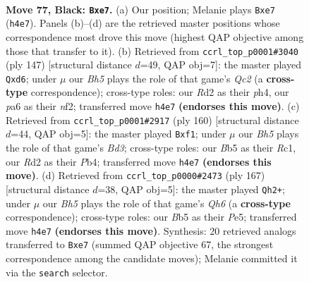 \documentclass[11pt]{article}
\begin{document}
\clearpage

\begin{figure}[p]\centering
\begin{subfigure}{0.46\textwidth}\centering
\resizebox{\linewidth}{!}{%
\newchessgame
\chessboard[
  setfen={8/4Rk2/P3R3/1b3p2/5P1b/8/3r4/6K1 b - - 0 77},
  showmover=false,
  pgfstyle=straightmove, color=movearrow, markmove={h4-e7}
]}
\caption{}
\end{subfigure}\hfill
\begin{subfigure}{0.46\textwidth}\centering
\resizebox{\linewidth}{!}{%
\newchessgame
\chessboard[
  setfen={8/2q5/3R2p1/1P2kb2/3R3P/5P2/5NK1/8 b - - 3 74},
  showmover=false,
  pgfstyle=straightmove, color=movearrow, markmove={c7-d6}
]}
\caption{}
\end{subfigure}
\\[4pt]
\begin{subfigure}{0.46\textwidth}\centering
\resizebox{\linewidth}{!}{%
\newchessgame
\chessboard[
  setfen={8/Pb4p1/3k3p/7P/1P6/3B1r2/3K4/2R2r2 w - - 0 81},
  showmover=false,
  pgfstyle=straightmove, color=movearrow, markmove={d3-f1}
]}
\caption{}
\end{subfigure}\hfill
\begin{subfigure}{0.46\textwidth}\centering
\resizebox{\linewidth}{!}{%
\newchessgame
\chessboard[
  setfen={8/8/1p4k1/4p1P1/P3R3/4R2q/5K2/8 b - - 18 84},
  showmover=false,
  pgfstyle=straightmove, color=movearrow, markmove={h3-h2}
]}
\caption{}
\end{subfigure}
\caption{\textbf{Move 77, Black: \texttt{Bxe7}.} (a) Our position; Melanie plays \texttt{Bxe7} (\texttt{h4e7}). Panels (b)--(d) are the retrieved master positions whose correspondence most drove this move (highest QAP objective among those that transfer to it). (b) Retrieved from \texttt{ccrl\_top\_p0001\#3040} (ply 147) [structural distance $d$=49, QAP obj=7]: the master played \texttt{Qxd6}; under $\mu$ our \emph{Bh5} plays the role of that game's \emph{Qc2} (a \textbf{cross-type} correspondence); cross-type roles: our \emph{R}d2 as their \emph{p}h4, our \emph{p}a6 as their \emph{n}f2; transferred move \texttt{h4e7} \textbf{(endorses this move)}. (c) Retrieved from \texttt{ccrl\_top\_p0001\#2917} (ply 160) [structural distance $d$=44, QAP obj=5]: the master played \texttt{Bxf1}; under $\mu$ our \emph{Bh5} plays the role of that game's \emph{Bd3}; cross-type roles: our \emph{B}b5 as their \emph{R}c1, our \emph{R}d2 as their \emph{P}b4; transferred move \texttt{h4e7} \textbf{(endorses this move)}. (d) Retrieved from \texttt{ccrl\_top\_p0000\#2473} (ply 167) [structural distance $d$=38, QAP obj=5]: the master played \texttt{Qh2+}; under $\mu$ our \emph{Bh5} plays the role of that game's \emph{Qh6} (a \textbf{cross-type} correspondence); cross-type roles: our \emph{B}b5 as their \emph{P}e5; transferred move \texttt{h4e7} \textbf{(endorses this move)}. Synthesis: 20 retrieved analogs transferred to \texttt{Bxe7} (summed QAP objective 67, the strongest correspondence among the candidate moves); Melanie committed it via the \texttt{search} selector.}
\label{fig:thought-m153}
\end{figure}
\end{document}
